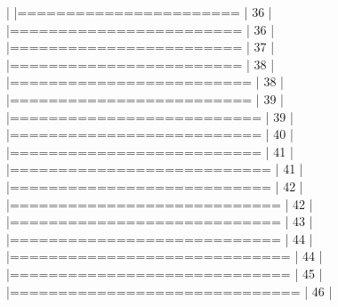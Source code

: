 \documentclass[10pt]{article}
\newenvironment{CodeChunk}{}{}
\begin{document}
\begin{CodeChunk}
\begin{CodeChunk}
\begin{CodeOutput}
  |                                                                       
  |=======================                                          |  36%
  |                                                                       
  |========================                                         |  36%
  |                                                                       
  |========================                                         |  37%
  |                                                                       
  |========================                                         |  38%
  |                                                                       
  |=========================                                        |  38%
  |                                                                       
  |=========================                                        |  39%
  |                                                                       
  |==========================                                       |  39%
  |                                                                       
  |==========================                                       |  40%
  |                                                                       
  |==========================                                       |  41%
  |                                                                       
  |===========================                                      |  41%
  |                                                                       
  |===========================                                      |  42%
  |                                                                       
  |============================                                     |  42%
  |                                                                       
  |============================                                     |  43%
  |                                                                       
  |============================                                     |  44%
  |                                                                       
  |=============================                                    |  44%
  |                                                                       
  |=============================                                    |  45%
  |                                                                       
  |==============================                                   |  46%
  |                                                                       

\end{CodeOutput}
\end{CodeChunk}
\end{CodeChunk}
\end{document}
